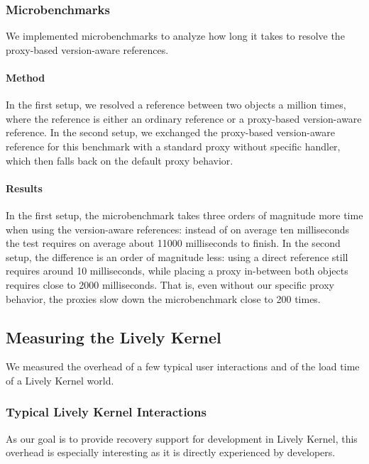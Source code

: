 \subsubsection{Microbenchmarks}

We implemented microbenchmarks to analyze how long it takes to resolve the proxy-based version-aware references.

\paragraph{Method}
In the first setup, we resolved a reference between two objects a million times, where the reference is either an ordinary reference or a proxy-based version-aware reference.
In the second setup, we exchanged the proxy-based version-aware reference for this benchmark with a standard proxy without specific handler, which then falls back on the default proxy behavior.

\paragraph{Results}
In the first setup, the microbenchmark takes three orders of magnitude more time when using the version-aware references: instead of on average ten milliseconds the test requires on average about 11000 milliseconds to finish.
In the second setup, the difference is an order of magnitude less: using a direct reference still requires around 10 milliseconds, while placing a proxy in-between both objects requires close to 2000 milliseconds.
That is, even without our specific proxy behavior, the proxies slow down the microbenchmark close to 200 times.



\subsection{Measuring the Lively Kernel}

We measured the overhead of a few typical user interactions and of the load time of a Lively Kernel world.

\subsubsection{Typical Lively Kernel Interactions}

As our goal is to provide recovery support for development in Lively Kernel, this overhead is especially interesting as it is directly experienced by developers.

